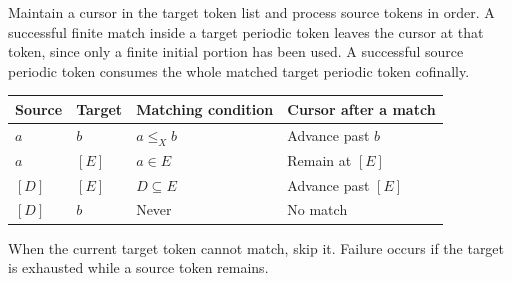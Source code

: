 \documentclass[11pt]{article}
\numberwithin{equation}{section}
\theoremstyle{plain}
\theoremstyle{definition}
\theoremstyle{remark}
\begin{document}
Maintain a cursor in the target token list and process source tokens in order. A successful finite match inside a target periodic token leaves the cursor at that token, since only a finite initial portion has been used. A successful source periodic token consumes the whole matched target periodic token cofinally.

\begin{center}
\begin{tabular}{@{}llll@{}}
\toprule
Source & Target & Matching condition & Cursor after a match\\
\midrule
$a$ & $b$ & $a\leq_X b$ & Advance past $b$\\
$a$ & $[E]$ & $a\in E$ & Remain at $[E]$\\
$[D]$ & $[E]$ & $D\subseteq E$ & Advance past $[E]$\\
$[D]$ & $b$ & Never & No match\\
\bottomrule
\end{tabular}
\end{center}

When the current target token cannot match, skip it. Failure occurs if the target is exhausted while a source token remains.
\end{document}
